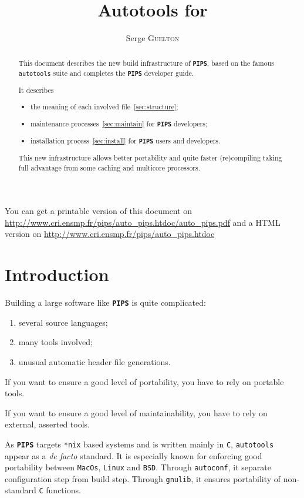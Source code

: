 \documentclass[a4paper]{article}
\title{Autotools for \PIPS{}}
\author{Serge \textsc{Guelton}}
\newcommand{\PIPS}{\textbf{\texttt{PIPS}}}
\newcommand{\autoconf}{\texttt{autoconf}}
\newcommand{\gnulib}{\texttt{gnulib}}
\newcommand{\PipsAutotoolsGuidePDF}{\url{http://www.cri.ensmp.fr/pips/auto_pips.htdoc/auto_pips.pdf}}
\newcommand{\PipsAutotoolsGuideHTDOC}{\url{http://www.cri.ensmp.fr/pips/auto_pips.htdoc}}
\begin{document}
\maketitle

\begin{abstract}
This document describes the new build infrastructure of \PIPS{},
 based on the famous \texttt{autotools} suite and completes the \PIPS{}
 developer guide.

It describes
\begin{itemize}
\item the meaning of each involved file~\ref{sec:structure};
\item maintenance processes~\ref{sec:maintain} for \PIPS{} developers;
\item installation process~\ref{sec:install} for \PIPS{} users and developers.
\end{itemize}

This new infrastructure allows better portability and quite faster
(re)compiling taking full advantage from some caching and multicore
processors.
\end{abstract}

You can get a printable version of this document on\\
\PipsAutotoolsGuidePDF{} and a HTML version on \PipsAutotoolsGuideHTDOC

\section{Introduction}

Building a large software like \PIPS{} is quite complicated:
\begin{enumerate}
\item several source languages;
\item many tools involved;
\item unusual automatic header file generations.
\end{enumerate}

If you want to ensure a good level of portability,
you have to rely on portable tools.

If you want to ensure a good level of maintainability,
you have to rely on external, asserted tools.

As \PIPS{} targets \texttt{*nix} based systems and is written mainly in \texttt{C},
\texttt{autotools} appear as a \emph{de facto} standard.
It is especially known for enforcing good portability between \texttt{MacOs}, \texttt{Linux} and \texttt{BSD}.
Through \autoconf{}, it separate configuration step from build step.
Through \gnulib{}, it ensures portability of non-standard \texttt{C} functions.
\end{document}
